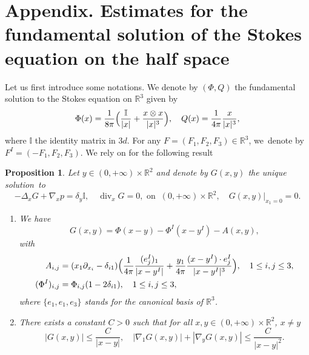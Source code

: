 \documentclass[JEP,XML,SOM,Unicode,NoEqCountersInSection,published]{cedram}
\renewcommand{\div}{\operatorname{div}}
\theoremstyle{plain}
\newtheorem{prop}[thm]{Proposition}
\theoremstyle{definition}
\newcommand{\R}{\mathbb{R}}
\begin{document}
\section*{Appendix. Estimates for the fundamental solution of the Stokes equation on the half space}
\label{appendix}
Let us first introduce some notations. We denote by $(\Phi,Q)$ the fundamental solution to the Stokes equation on $\R^3$ given by
\[
\Phi(x)=\frac{1}{8\pi}\Bigl(\frac{\mathbb{I}}{|x|}+\frac{x\otimes x}{|x|^3} \Bigr),\quad Q(x)=\frac{1}{4\pi} \frac{x}{|x|^3},
\]
where $\mathbb{I}$ the identity matrix in $3d$. For any $F=(F_1,F_2,F_3) \in \R^3$, we~denote by $F^I=(-F_1,F_2,F_3)$.
We rely on \cite[\S 3.1]{Gimbutas_Greengard_Veerapaneni_2015} for the following result
\begin{prop}\label{prop_appendix}
Let $y \!\in\! (0,+\infty)\times \R^2$ and denote by $G(x,y)$ the unique solution~to
\[
-\Delta_x G+\nabla_x p = \delta_{y} \mathbb{I}, \quad \div_x G= 0, \text{ on } \: (0,+\infty)\times \R^2, \quad G(x,y)\vert_{x_1=0}=0.
\]
\begin{enumerate}
\item We have
\[
G(x,y)=\Phi(x-y)-\Phi^I(x-y^I)-A(x,y),
\]
with
\begin{align*}
A_{i,j} &= (x_1 \partial_{x_i}-\delta_{i1})\Bigl(\frac{1}{4\pi}\frac{(e_j^I)_1}{|x-y^I|}+\frac{y_1}{4\pi} \frac{(x-y^I)\cdot e_j^I}{|x-y^I|^3} \Bigr), \quad 1 \leq i,j\leq 3,\\
(\Phi^I)_{i,j}&=\Phi_{i,j}(1-2\delta_{i1}), \quad 1 \leq i,j\leq 3,
\end{align*}
where $\{e_1,e_1,e_3\}$ stands for the canonical basis of $\R^3$.
\item There exists a constant $C>0$ such that for all $x,y \in (0,+\infty)\times \R^2 $, $x\neq y$
\[
|G(x,y)| \leq \frac{C}{|x-y|}, \quad | \nabla_1 G(x,y)| + | \nabla_y G(x,y)| \leq \frac{C}{|x-y|^2}.
\]
\end{enumerate}
\end{prop}
\end{document}
